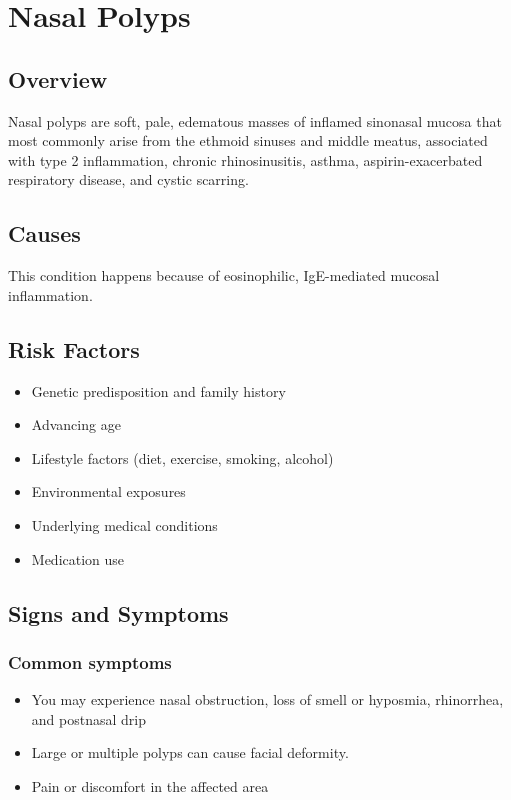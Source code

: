 \chapter{Nasal Polyps}
\label{sec:Nasal Polyps}

\section{Overview}
Nasal polyps are soft, pale, edematous masses of inflamed sinonasal mucosa that most commonly arise from the ethmoid sinuses and middle meatus, associated with type 2 inflammation, chronic rhinosinusitis, asthma, aspirin-exacerbated respiratory disease, and cystic scarring.
\section{Causes}
This condition happens because of eosinophilic, IgE-mediated mucosal inflammation.     
\section{Risk Factors}

\begin{itemize}[noitemsep]
  \item Genetic predisposition and family history
  \item Advancing age
  \item Lifestyle factors (diet, exercise, smoking, alcohol)
  \item Environmental exposures
  \item Underlying medical conditions
  \item Medication use
\end{itemize}
\section{Signs and Symptoms}

\subsection{Common symptoms}
\begin{itemize}[noitemsep]
  \item You may experience nasal obstruction, loss of smell or hyposmia, rhinorrhea, and postnasal drip
  \item Large or multiple polyps can cause facial deformity.
  \item Pain or discomfort in the affected area
  \end{itemize}

